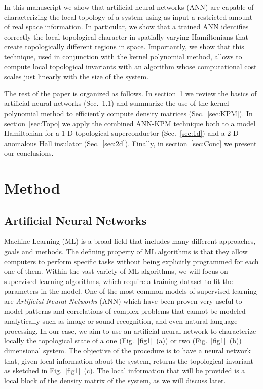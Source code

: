 In this manuscript we show that artificial neural networks (ANN) are capable of
characterizing the local topology of a system using as input a restricted amount
of real space information.
In particular, we show that a trained ANN identifies correctly the local
topological character in spatially varying Hamiltonians that create
topologically different regions in space.
Importantly, we show that this technique, used in conjunction with the kernel
polynomial method, allows to compute local topological invariants with
an algorithm whose computational cost scales just linearly with the size of the
system.

The rest of the paper is organized as follows. In section~\ref{sec:met} we
review the basics of artificial neural networks (Sec.~\ref{sec:NN}) and
summarize the use of the kernel polynomial method to efficiently compute density
matrices (Sec.~\ref{sec:KPM}).
In section~\ref{sec:Topo} we apply the combined ANN-KPM technique both to a
model Hamiltonian for a 1-D topological superconductor (Sec.~\ref{sec:1d}) and a
2-D anomalous Hall insulator (Sec.~\ref{sec:2d}). Finally, in
section~\ref{sec:Conc} we present our conclusions.




\section{Method}
\label{sec:met}
\subsection{Artificial Neural Networks}
\label{sec:NN}
Machine Learning (ML) is a broad field that includes many different approaches,
goals and methods.\cite{Solomonoff1957}
The defining property of ML algorithms is that they allow computers to perform
specific tasks without being explicitly programmed for each one of
them.\cite{Samuel1959} Within the vast variety of ML algorithms, we will focus
on supervised learning algorithms, which require a training dataset to fit the
parameters in the model. One of the most common models of supervised learning are
\emph{Artificial Neural Networks} (ANN) which have been proven very useful to
model patterns and correlations of complex problems that cannot be modeled
analytically such as image or sound
recognition,\cite{alexnet2012,Dede20107,Lecun1998} and even natural language
processing.\cite{Goldberg2015,Bengio2003}
In our case, we aim to use an artificial neural network to characterize
locally the topological state of a one (Fig.~\ref{fig1}~(a)) or two
(Fig.~\ref{fig1}~(b)) dimensional system. The objective of the procedure
is to have a neural network that, given local information about the system,
returns the topological invariant as sketched in Fig.~\ref{fig1}~(c).
The local information that will be provided is a local block of the density
matrix of the system, as we will discuss later.

